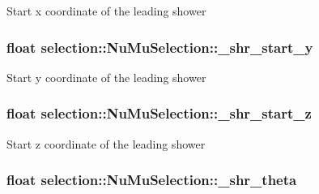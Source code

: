 Start x coordinate of the leading shower \hypertarget{classselection_1_1NuMuSelection_af6c46477cac6efcb513d028e39f707d2}{
\subsubsection[{\-\_\-shr\-\_\-start\-\_\-y}]{\setlength{\rightskip}{0pt plus 5cm}float selection\-::\-Nu\-Mu\-Selection\-::\-\_\-shr\-\_\-start\-\_\-y\hspace{0.3cm}{\ttfamily [private]}}}\label{classselection_1_1NuMuSelection_af6c46477cac6efcb513d028e39f707d2}
Start y coordinate of the leading shower \hypertarget{classselection_1_1NuMuSelection_a9ecc838bf83d8279c7e975aff432f06e}{
\subsubsection[{\-\_\-shr\-\_\-start\-\_\-z}]{\setlength{\rightskip}{0pt plus 5cm}float selection\-::\-Nu\-Mu\-Selection\-::\-\_\-shr\-\_\-start\-\_\-z\hspace{0.3cm}{\ttfamily [private]}}}\label{classselection_1_1NuMuSelection_a9ecc838bf83d8279c7e975aff432f06e}
Start z coordinate of the leading shower \hypertarget{classselection_1_1NuMuSelection_a721b8729afb4676418e64ae74dfc24fe}{
\subsubsection[{\-\_\-shr\-\_\-theta}]{\setlength{\rightskip}{0pt plus 5cm}float selection\-::\-Nu\-Mu\-Selection\-::\-\_\-shr\-\_\-theta\hspace{0.3cm}{\ttfamily [private]}}}\label{classselection_1_1NuMuSelection_a721b8729afb4676418e64ae74dfc24fe}
